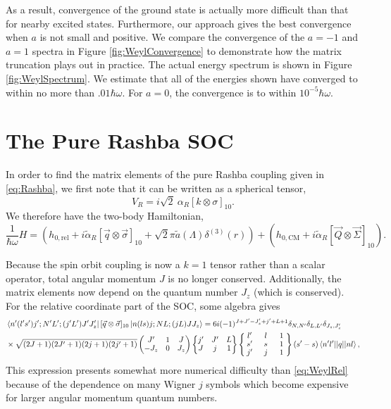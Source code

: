 \documentclass[%
 preprint,
 amsmath,amssymb,
 aps,
]{revtex4-1}
\newcommand{\threej}[6]{ \begin{pmatrix}
  #1 & #2 & #3 \\
  #4 & #5 & #6 
 \end{pmatrix}}
\newcommand{\sixj}[6]{ \begin{Bmatrix}
  #1 & #2 & #3 \\
  #4 & #5 & #6 
 \end{Bmatrix}}
\newcommand{\ninej}[9]{ \begin{Bmatrix}
  #1 & #2 & #3 \\
  #4 & #5 & #6 \\
  #7 & #8 & #9
 \end{Bmatrix}}
\begin{document}
As a result, convergence of the ground state is actually more difficult than that for nearby excited states. Furthermore, our approach gives the best convergence when $a$ is not small and positive. We compare the convergence of the $a=-1$ and $a=1$ spectra in Figure \ref{fig:WeylConvergence} to demonstrate how the matrix truncation plays out in practice. The actual energy spectrum is shown in Figure \ref{fig:WeylSpectrum}. We estimate that all of the energies shown have converged to within no more than $.01\hbar\omega$. For $a=0$, the convergence is to within $10^{-5}\hbar\omega$.

\section{\label{sec:Rashba}The Pure Rashba SOC}

In order to find the matrix elements of the pure Rashba coupling given in \eqref{eq:Rashba}, we first note that it can be written as a spherical tensor,
\begin{equation}
V_{R}=i\sqrt{2}\:\alpha_R \left[ k \otimes \sigma \right]_{10}.
\end{equation}
We therefore have the two-body Hamiltonian,
\begin{equation}\label{eq:RashbaHamiltonian}
\frac{1}{\hbar\omega}H=\left(h_{0,\text{rel}}+i \tilde{\alpha}_R  \left[ \vec{q} \otimes \vec{\sigma} \right]_{10} + \sqrt{2}\pi \tilde{a}(\Lambda) \delta^{(3)}(r)\right)+\left(h_{0,\text{CM}}+i \tilde{\alpha}_R [ \vec{Q}\otimes \vec{\Sigma} ]_{10} \right).
\end{equation}

Because the spin orbit coupling is now a $k=1$ tensor rather than a scalar operator, total angular momentum $J$ is no longer conserved. Additionally, the matrix elements now depend on the quantum number $J_z$ (which is conserved). For the relative coordinate part of the SOC, some algebra gives
\begin{equation}\begin{split}
&\bra{n'(l's')j';N'L';(j'L')J'J'_z}  [ \vec{q} \otimes \vec{\sigma} ]_{10}  \ket{n(ls)j;NL;(jL)JJ_z} =6 i (-1)^{J+J'-J'_z+j'+L+1}\delta_{N,N'}\delta_{L,L'}\delta_{J_z,J'_z} \\
 &\times\sqrt{(2J+1)(2J'+1)(2j+1)(2j'+1)} \threej{J'}{1}{J}{-J_z}{0}{J_z} \sixj{j'}{J'}{L}{J}{j}{1}
 \renewcommand{\arraystretch}{0.9}
 \ninej{\hphantom{l}l'\hphantom{l}}{\hphantom{l}l\hphantom{l}}{\hphantom{l}1\hphantom{l}}{s'}{s}{1}{j'}{j}{1} (s'-s) \braket{n'l' || q || n l},
\end{split}
\end{equation}
This expression presents somewhat more numerical difficulty than \eqref{eq:WeylRel} because of the dependence on many Wigner $j$ symbols which become expensive for larger angular momentum quantum numbers.
\end{document}
